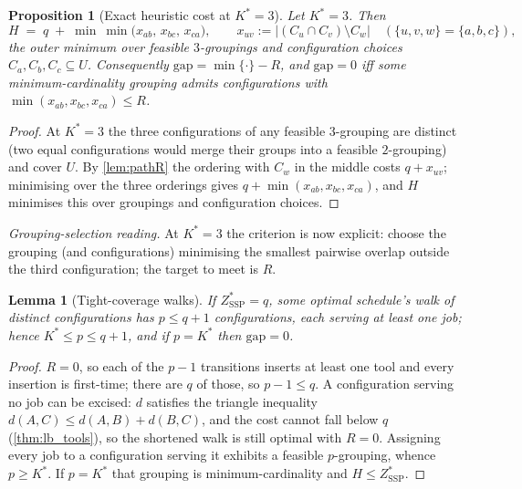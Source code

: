 \documentclass[11pt,a4paper]{article}
\theoremstyle{plain}
\newtheorem{lemma}[theorem]{Lemma}
\newtheorem{proposition}[theorem]{Proposition}
\theoremstyle{definition}
\newcommand{\Kstar}{K^{*}}
\newcommand{\ZSSP}{Z_{\mathrm{SSP}}^{*}}
\begin{document}
\begin{thmbox}
\begin{proposition}[Exact heuristic cost at $\Kstar=3$]
\label{prop:hk3}
Let $\Kstar=3$. Then
\[
  H\;=\;q\;+\;\min\ \min\bigl(x_{ab},\,x_{bc},\,x_{ca}\bigr),
  \qquad x_{uv}:=|(C_u\cap C_v)\setminus C_w|\quad(\{u,v,w\}=\{a,b,c\}),
\]
the outer minimum over feasible $3$-groupings and configuration choices
$C_a,C_b,C_c\subseteq U$. Consequently $\mathrm{gap}=\min\{\cdot\}-R$, and
$\mathrm{gap}=0$ iff some minimum-cardinality grouping admits configurations with
$\min(x_{ab},x_{bc},x_{ca})\le R$.
\end{proposition}
\end{thmbox}
\begin{proofbox}
\begin{proof}
At $\Kstar=3$ the three configurations of any feasible $3$-grouping are distinct
(two equal configurations would merge their groups into a feasible $2$-grouping)
and cover $U$. By \cref{lem:pathR} the ordering with $C_w$ in the middle costs
$q+x_{uv}$; minimising over the three orderings gives $q+\min(x_{ab},x_{bc},
x_{ca})$, and $H$ minimises this over groupings and configuration choices.
\end{proof}
\end{proofbox}

\noindent\emph{Grouping-selection reading.} At $\Kstar=3$ the criterion is now
explicit: choose the grouping (and configurations) minimising the smallest pairwise
overlap outside the third configuration; the target to meet is $R$.

\begin{thmbox}
\begin{lemma}[Tight-coverage walks]
\label{lem:tightwalk}
If $\ZSSP=q$, some optimal schedule's walk of distinct configurations has
$p\le q+1$ configurations, each serving at least one job; hence
$\Kstar\le p\le q+1$, and if $p=\Kstar$ then $\mathrm{gap}=0$.
\end{lemma}
\end{thmbox}
\begin{proofbox}
\begin{proof}
$R=0$, so each of the $p-1$ transitions inserts at least one tool and every
insertion is first-time; there are $q$ of those, so $p-1\le q$. A configuration
serving no job can be excised: $d$ satisfies the triangle inequality
$d(A,C)\le d(A,B)+d(B,C)$, and the cost cannot fall below $q$
(\cref{thm:lb_tools}), so the shortened walk is still optimal with $R=0$.
Assigning every job to a configuration serving it exhibits a feasible
$p$-grouping, whence $p\ge\Kstar$. If $p=\Kstar$ that grouping is
minimum-cardinality and $H\le\ZSSP$.
\end{proof}
\end{proofbox}
\end{document}
